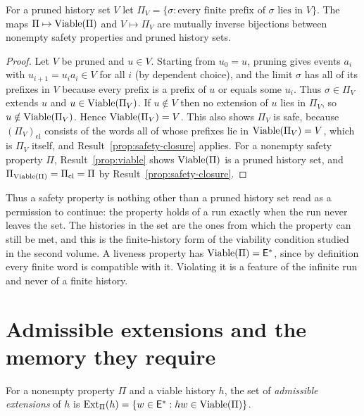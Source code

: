 \begin{established}\label{prop:safety-trees}
For a pruned history set $V$ let $\Pi_V=\{\sigma:\text{every finite prefix of }\sigma\text{ lies in }V\}$. The maps $\Pi\mapsto\operatorname{Viable}(\Pi)$ and $V\mapsto\Pi_V$ are mutually inverse bijections between nonempty safety properties and pruned history sets.
\end{established}
\begin{proof}
Let $V$ be pruned and $u\in V$. Starting from $u_0=u$, pruning gives events $a_i$ with $u_{i+1}=u_ia_i\in V$ for all $i$ (by dependent choice), and the limit $\sigma$ has all of its prefixes in $V$ because every prefix is a prefix of $u$ or equals some $u_i$. Thus $\sigma\in\Pi_V$ extends $u$ and $u\in\operatorname{Viable}(\Pi_V)$. If $u\notin V$ then no extension of $u$ lies in $\Pi_V$, so $u\notin\operatorname{Viable}(\Pi_V)$. Hence $\operatorname{Viable}(\Pi_V)=V$. This also shows $\Pi_V$ is safe, because $(\Pi_V)_{\mathrm{cl}}$ consists of the words all of whose prefixes lie in $\operatorname{Viable}(\Pi_V)=V$, which is $\Pi_V$ itself, and Result~\ref{prop:safety-closure} applies. For a nonempty safety property $\Pi$, Result~\ref{prop:viable} shows $\operatorname{Viable}(\Pi)$ is a pruned history set, and $\Pi_{\operatorname{Viable}(\Pi)}=\Pi_{\mathrm{cl}}=\Pi$ by Result~\ref{prop:safety-closure}.
\end{proof}

Thus a safety property is nothing other than a pruned history set read as a permission to continue: the property holds of a run exactly when the run never leaves the set. The histories in the set are the ones from which the property can still be met, and this is the finite-history form of the viability condition studied in the second volume. A liveness property has $\operatorname{Viable}(\Pi)=\mathsf{E}^{*}$, since by definition every finite word is compatible with it. Violating it is a feature of the infinite run and never of a finite history.

\section{Admissible extensions and the memory they require}

\begin{definition}\label{def:admissible-ext}
For a nonempty property $\Pi$ and a viable history $h$, the set of \emph{admissible extensions} of $h$ is $\operatorname{Ext}_\Pi(h)=\{w\in\mathsf{E}^{*}: hw\in\operatorname{Viable}(\Pi)\}$.
\end{definition}

